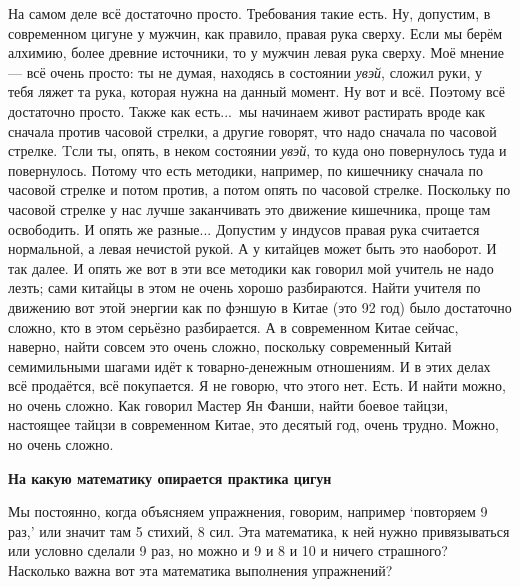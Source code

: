 \T
На самом деле всё достаточно просто. Требования такие есть. Ну, допустим, в современном цигуне
у мужчин,
как правило, правая рука
сверху. Если мы берём алхимию, более древние источники, то у мужчин левая рука сверху. Моё мнение
--- всё очень просто:
ты не думая, находясь в состоянии {\it увэй}, сложил руки, у тебя ляжет та рука, которая нужна
на данный момент. Ну
вот и всё. Поэтому всё достаточно просто. Также как есть...\ мы начинаем живот растирать вроде
как сначала против
часовой стрелки, а другие говорят, что надо сначала по часовой стрелке.\hfil\break
\indent
Tсли ты, опять, в неком состоянии {\it увэй}, то куда оно повернулось туда и
повернулось.
Потому что есть методики, например, по кишечнику сначала по часовой стрелке и потом против, а потом
опять по часовой
стрелке. Поскольку по часовой стрелке у нас лучше заканчивать это движение кишечника, проще
там освободить.\hfil\break
\indent
И опять же разные... Допустим у индусов правая рука считается нормальной,
а левая нечистой рукой. А у
китайцев может быть это наоборот.
И так далее. И опять же вот в эти
все методики как говорил
мой учитель не надо лезть; сами китайцы в этом не очень хорошо разбираются.
Найти учителя по
движению вот этой
энергии как по фэншую в Китае (это 92 год) было достаточно сложно, кто в этом серьёзно
разбирается. А в современном Китае сейчас, наверно, найти совсем это очень
сложно, поскольку
современный Китай семимильными шагами идёт к товарно-денежным отношениям. И в этих
делах всё продаётся,
всё покупается.\hfil\break
\indent
Я не говорю, что этого нет. Есть. И найти можно, но очень сложно. Как говорил Мастер Ян Фанши,
найти боевое тайцзи,
настоящее тайцзи в современном Китае, это десятый год, очень трудно. Можно, но очень сложно.

\null
\centerline{\bf На какую математику опирается практика цигун}
\null

\A
Мы постоянно, когда объясняем упражнения, говорим, например `повторяем 9 раз,'
или значит там 5 стихий, 8 сил.
Эта математика, к ней нужно привязываться или условно сделали 9 раз, но
можно и 9 и 8 и 10 и ничего страшного? Насколько важна вот эта математика выполнения упражнений?

